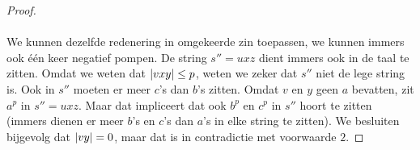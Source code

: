\documentclass[a4paper]{article}
\begin{document}
\begin{question}
\begin{answer}
\begin{enumerate}
\begin{proof}
\paragraph{}
We kunnen dezelfde redenering in omgekeerde zin toepassen, we kunnen immers ook \'e\'en keer negatief pompen. De string $s''=uxz$ dient immers ook in de taal te zitten. Omdat we weten dat $\left|vxy\right|\leq p$, weten we zeker dat $s''$ niet de lege string is. Ook in $s''$ moeten er meer $c$'s dan $b$'s zitten. Omdat $v$ en $y$ geen $a$ bevatten, zit $a^p$ in $s''=uxz$. Maar dat impliceert dat ook $b^p$ en $c^p$ in $s''$ hoort te zitten (immers dienen er meer $b$'s en $c$'s dan $a$'s in elke string te zitten). We besluiten bijgevolg dat $\left|vy\right|=0$, maar dat is in contradictie met voorwaarde $2$.
\end{proof}
\end{enumerate}
\end{answer}
\end{question}
\end{document}
